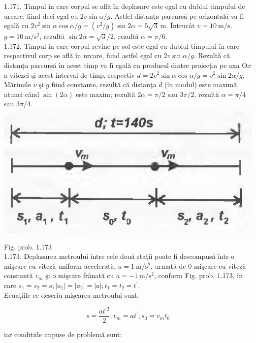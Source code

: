 \documentclass[10pt]{article}
\begin{document}
1.171. Timpul în care corpul se află în deplasare este egal cu dublul timpului de urcare, fiind deci egal cu $2 v \sin \alpha / g$. Astfel distanţa parcursă pe orizontală va fì egală cu $2 v^{2} \sin \alpha \cos \alpha / g=\left(v^{2} / g\right) \sin 2 \alpha=5 \sqrt{3} \mathrm{~m}$. Întrucât $v=10 \mathrm{~m} / \mathrm{s}$, $g=10 \mathrm{~m} / \mathrm{s}^{2}$, rezultă $\sin 2 \alpha=\sqrt{3} / 2$, rezultă $\alpha=\pi / 6$.\\
1.172. Timpul în care corpul revine pe sol este egal cu dublul timpului în care respectivul corp se află în urcare, fiind astfel egal cu $2 v \sin \alpha / g$. Rezultă că distanța parcursă în acest timp va fỉ egală cu produsul dintre proiecția pe axa $\mathrm{O} x$ a vitezei şi acest interval de timp, respectiv $d=2 v^{2} \sin \alpha \cos \alpha / g=v^{2} \sin 2 \alpha / g$. Mărimile $\nu$ şi $g$ fiind constante, rezultă că distanţa $d$ (în modul) este maximă atunci când $\sin (2 \alpha)$ este maxim; rezultă $2 \alpha=\pi / 2$ sau $3 \pi / 2$, rezultă $\alpha=\pi / 4$ sau $3 \pi / 4$.\\
\includegraphics[max width=\textwidth, center]{2025_07_01_5b3ff9fa0d508c8e9f17g-236}

Fig. prob. 1.173\\
1.173. Deplasarea metroului între cele două staţii poate fi descompusă într-o mişcare cu viteză uniform accelerată, $a=1 \mathrm{~m} / \mathrm{s}^{2}$, urmată de 0 mişcare cu viteză constantă $v_{m}$ şi o mişcare frânată cu $a=-1 \mathrm{~m} / \mathrm{s}^{2}$, conform Fig. prob. 1.173, în care $s_{1}=s_{2}=s ;\left|a_{1}\right|=\left|a_{2}\right|=|a| ; t_{1}=t_{2}=t^{\prime}$.\\
Ecuațiile ce descriu mişcarea metroului sunt:

$$
s=\frac{a t^{\prime 2}}{2} ; v_{m}=a t^{\prime} ; s_{0}=v_{m} t_{0}
$$

iar condițiile impuse de problemă sunt:
\end{document}
